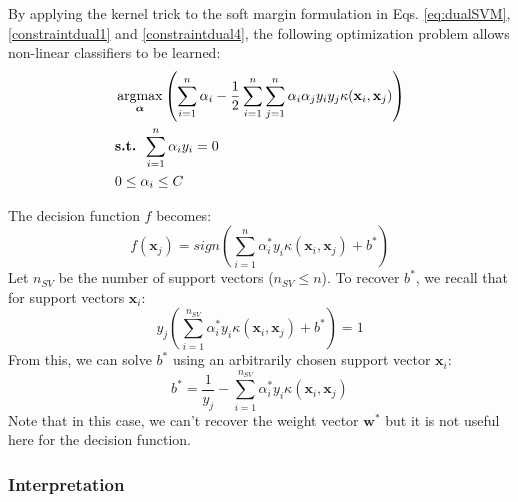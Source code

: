 By applying the kernel trick to the soft margin formulation in Eqs. \ref{eq:dualSVM}, \ref{constraintdual1} and \ref{constraintdual4}, the following optimization problem allows non-linear classifiers to be learned:
\begin{align}
	& \argmax_{\boldsymbol{\alpha}} \left( 
	\sum\limits_{i=1}^{n} \alpha_i - \frac{1}{2} \sum\limits_{i=1}^{n} \sum\limits_{j=1}^{n} \alpha_i \alpha_j y_i y_j \kappa(\textbf{x}_i , \textbf{x}_j) 
	\right) 
	\label{eq:dualSVM2kernel}\\
	& \textbf{s.t. } \sum\limits_{i=1}^{n}\alpha_i y_i = 0 \label{constraintdual3kernel}\\
	& 0 \leq \alpha_i \leq C  \label{constraintdual4kernel}
\end{align}

\noindent The decision function $f$ becomes:
\begin{equation}
f(\textbf{x}_j) = sign\left( \sum\limits_{i=1}^{n} \alpha_i^*y_i \kappa(\textbf{x}_i,\textbf{x}_j) + b^*\right)  \label{decisionDualKernel}
\end{equation} 
\noindent Let $n_{SV}$ be the number of support vectors ($n_{SV} \leq n$). To recover $b^*$, we recall that for support vectors $\textbf{x}_i$:
\begin{equation}
	y_j \left( \sum\limits_{i=1}^{n_{SV}} \alpha_i^* y_i \kappa(\textbf{x}_i,\textbf{x}_j) + b^* \right) = 1
\end{equation}
From this, we can solve $b^*$ using an arbitrarily chosen support vector $\textbf{x}_i$:
\begin{equation}
	b^* = \frac{1}{y_j} - \sum\limits_{i=1}^{n_{SV}} \alpha_i^* y_i \kappa(\textbf{x}_i,\textbf{x}_j)
\end{equation}
\noindent Note that in this case, we can't recover the weight vector $\textbf{w}^*$ but it is not useful here for the decision function.

\newpage 
\subsubsection{Interpretation}
\label{subsec:interpretation}

